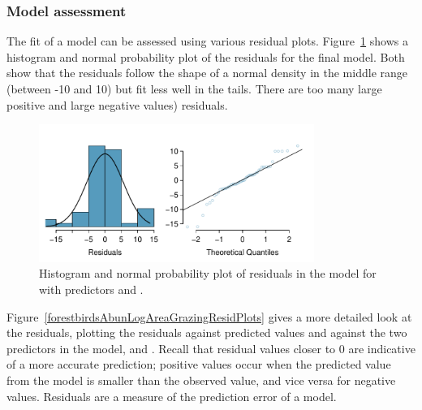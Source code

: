 \subsubsection{Model assessment}

The fit of a model can be assessed using various residual plots. Figure~\ref{forestbirdsAbunLogAreaGrazingNormPlots} shows a histogram and normal probability plot of the residuals for the final model. Both show that the residuals follow the shape of a normal density in the middle range (between -10 and 10) but fit less well in the tails. There are too many large positive and large negative values) residuals.

 \begin{figure}[h!]
 	\centering
 	\includegraphics[width=0.8\textwidth]
{ch_multiple_linear_regression_oi_biostat/figures/forestbirdsAbunLogAreaGrazingNormPlots/forestbirdsAbunLogAreaGrazingNormPlots.pdf}
     \caption{Histogram and normal probability plot of residuals in the model for  with predictors  and .}
    	\label{forestbirdsAbunLogAreaGrazingNormPlots}
 \end{figure}

Figure~\ref{forestbirdsAbunLogAreaGrazingResidPlots} gives a more detailed look at the residuals, plotting the residuals against predicted values and against the two predictors in the model,  and . Recall that residual values closer to 0 are indicative of a more accurate prediction; positive values occur when the predicted value from the model is smaller than the observed value, and vice versa for negative values. Residuals are a measure of the prediction error of a model.

